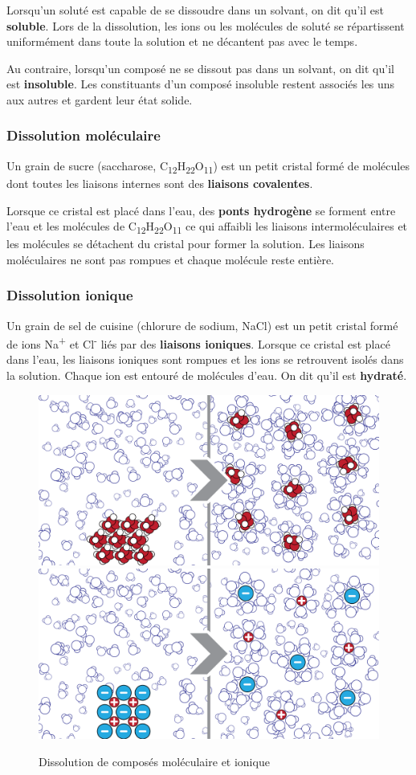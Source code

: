 \documentclass[
  11pt,
  french,
  a4paper,
  openany]{book}
\begin{document}
Lorsqu'un soluté est capable de se dissoudre dans un solvant, on dit qu'il est \textbf{soluble}. Lors de la dissolution, les ions ou les molécules de soluté se répartissent uniformément dans toute la solution et ne décantent pas avec le temps.

Au contraire, lorsqu'un composé ne se dissout pas dans un solvant, on dit qu'il est \textbf{insoluble}. Les constituants d'un composé insoluble restent associés les uns aux autres et gardent leur état solide.

\hypertarget{dissolution-moluxe9culaire}{%
\subsubsection{Dissolution moléculaire}\label{dissolution-moluxe9culaire}}

Un grain de sucre (saccharose, C\textsubscript{12}H\textsubscript{22}O\textsubscript{11}) est un petit cristal formé de molécules dont toutes les liaisons internes sont des \textbf{liaisons covalentes}.

Lorsque ce cristal est placé dans l'eau, des \textbf{ponts hydrogène} se forment entre l'eau et les molécules de C\textsubscript{12}H\textsubscript{22}O\textsubscript{11} ce qui affaibli les liaisons intermoléculaires et les molécules se détachent du cristal pour former la solution. Les liaisons moléculaires ne sont pas rompues et chaque molécule reste entière.

\hypertarget{dissolution-ionique}{%
\subsubsection{Dissolution ionique}\label{dissolution-ionique}}

Un grain de sel de cuisine (chlorure de sodium, NaCl) est un petit cristal formé de ions Na\textsuperscript{+} et Cl\textsuperscript{-} liés par des \textbf{liaisons ioniques}.
Lorsque ce cristal est placé dans l'eau, les liaisons ioniques sont rompues et les ions se retrouvent isolés dans la solution. Chaque ion est entouré de molécules d'eau. On dit qu'il est \textbf{hydraté}.

\begin{figure}

{\centering \includegraphics[width=0.45\linewidth]{images/dissolution-1} \includegraphics[width=0.45\linewidth]{images/dissolution-2} 

}

\caption{Dissolution de composés moléculaire et ionique}\label{fig:ionique-moleculaire}
\end{figure}
\end{document}
